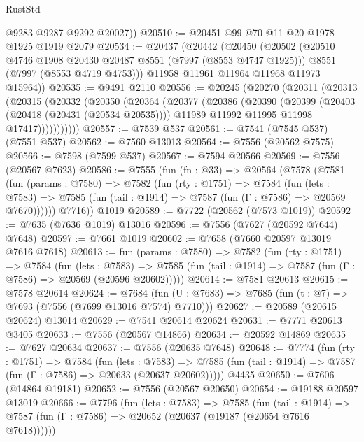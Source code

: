 \begin{lexlean}{RustStd}
\begin{coremodule}
        @9283
        @9287
        @9292
        @20027))
@20510 := @20451 @99 @70 @11 @20 @1978 @1925 @1919 @2079
@20534 := @20437
    (@20442
      (@20450
        (@20502
          (@20510 @4746 @1908 @20430 @20487 @8551 (@7997 (@8553 @4747 @1925)))
          @8551
          (@7997 (@8553 @4719 @4753)))
        @11958
        @11961
        @11964
        @11968
        @11973
        @15964))
@20535 := @9491 @2110
@20556 := @20245
    (@20270
      (@20311
        (@20313
          (@20315
            (@20332
              (@20350
                (@20364
                  (@20377
                    (@20386
                      (@20390
                        (@20399
                          (@20403 (@20418 (@20431 (@20534 @20535))))
                          @11989
                          @11992
                          @11995
                          @11998
                          @17417)))))))))))
@20557 := @7539 @537
@20561 := @7541 (@7545 @537) (@7551 @537)
@20562 := @7560 @13013
@20564 := @7556 (@20562 @7575)
@20566 := @7598 (@7599 @537)
@20567 := @7594 @20566
@20569 := @7556 (@20567 @7623)
@20586 := @7555
    (fun (fn : @33) =>
    @20564
      (@7578
        (@7581
          (fun (params : @7580) =>
          @7582
            (fun (rty : @1751) =>
            @7584
              (fun (lets : @7583) =>
              @7585 (fun (tail : @1914) => @7587 (fun (Γ : @7586) => @20569 @7670))))))
        @7716))
    @1019
@20589 := @7722 (@20562 (@7573 @1019))
@20592 := @7635 (@7636 @1019) @13016
@20596 := @7556 (@7627 (@20592 @7644) @7648)
@20597 := @7661 @1019
@20602 := @7658 (@7660 @20597 @13019 @7616 @7618)
@20613 := fun (params : @7580) =>
  @7582
    (fun (rty : @1751) =>
    @7584
      (fun (lets : @7583) =>
      @7585 (fun (tail : @1914) => @7587 (fun (Γ : @7586) => @20569 (@20596 @20602)))))
@20614 := @7581 @20613
@20615 := @7578 @20614
@20624 := @7684
    (fun (U : @7683) => @7685 (fun (t : @7) => @7693 (@7556 (@7699 @13016 @7574) @7710)))
@20627 := @20589 (@20615 @20624) @13014
@20629 := @7541 @20614 @20624
@20631 := @7771 @20613 @3405
@20633 := @7556 (@20567 @14866)
@20634 := @20592 @14869
@20635 := @7627 @20634
@20637 := @7556 (@20635 @7648)
@20648 := @7774
    (fun (rty : @1751) =>
    @7584
      (fun (lets : @7583) =>
      @7585 (fun (tail : @1914) => @7587 (fun (Γ : @7586) => @20633 (@20637 @20602)))))
    @4435
@20650 := @7606 (@14864 @19181)
@20652 := @7556 (@20567 @20650)
@20654 := @19188 @20597 @13019
@20666 := @7796
    (fun (lets : @7583) =>
    @7585
      (fun (tail : @1914) =>
      @7587 (fun (Γ : @7586) => @20652 (@20637 (@19187 (@20654 @7616 @7618))))))

\end{coremodule}
\end{lexlean}
